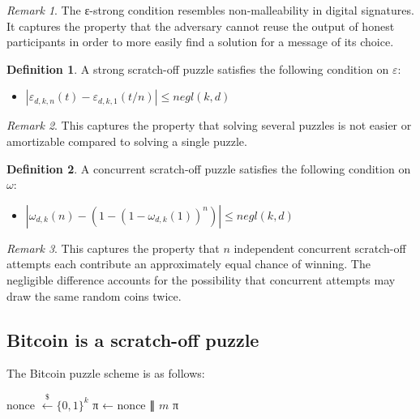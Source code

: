 \documentclass{article}
\theoremstyle{definition}
\newtheorem{definition}{Definition}
\theoremstyle{remark}
\newtheorem{remark}{Remark}
\newcommand{\hash}{\mathcal{H}}
\newcommand{\samples}{\overset{\$}{←}}
\begin{document}
\begin{remark}
The ε-strong condition resembles non-malleability in digital signatures. It captures the property that the adversary cannot reuse the output of honest participants in order to more easily find a solution for a message of its choice.
\end{remark}

\begin{definition}A strong scratch-off puzzle satisfies the following condition on $ε$:
\begin{itemize}
  \item $|ε_{d,k,n}(t) - ε_{d,k,1}(t/n)| ≤ negl(k,d)$
\end{itemize}
\end{definition}

\begin{remark}
This captures the property that solving several puzzles is not easier or amortizable compared to solving a single puzzle.
\end{remark}

\begin{definition}A concurrent scratch-off puzzle satisfies the following condition on $ω$:
\begin{itemize}
  \item $|ω_{d,k}(n) - (1-(1-ω_{d,k}(1))^n)| ≤ negl(k,d)$
\end{itemize}
\end{definition}

\begin{remark}
This captures the property that $n$ independent concurrent scratch-off attempts each contribute an approximately equal chance of winning. The negligible difference accounts for the possibility that concurrent attempts may draw the same random coins twice.
\end{remark}

\subsection{Bitcoin is a scratch-off puzzle}

The Bitcoin puzzle scheme is as follows:
\begin{algorithmic}[0]
    \State nonce $\samples \{0,1\}^k$
    \State π ← nonce ∥ $m$
    \State \Return π
  \EndFunction
  \State
    \State \Return {$\hash(puz || π) < 2^{-d}$}
  \EndFunction
\end{algorithmic}
\end{document}
